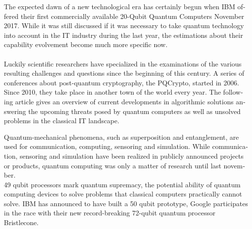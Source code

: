 \documentclass[a4paper,11pt,draft]{article}
\begin{document}
\begin{otherlanguage}{english}

\vspace{3mm}
\begin{multicols}{2}
\noindent


The expected dawn of a new technological era has certainly begun when IBM offered their first commercially available 20-Qubit Quantum Computers November 2017.
While it was still discussed if it was necessary to take quantum technology into account in the IT industry during the last year, the estimations about their capability evolvement become much more specific now.\\ \\
Luckily scientific researchers have specialized in the examinations of the various resulting challenges and questions since the beginning of this century. A series of conferences about post-quantum cryptography, the PQCrypto, started in 2006. Since 2010, they take place in another town of the world every year. The following article gives an overview of current developments in algorithmic solutions answering the upcoming threats posed by quantum computers as well as unsolved problems in the classical IT landscape. 

Quantum-mechanical phenomena, such as superposition and entanglement, are used for communication, computing, sensoring and simulation. While communication, sensoring and simulation have been realized in publicly announced projects or products, quantum computing was only a matter of research until last november. \\
49 qubit processors mark quantum supremacy, the potential ability of quantum computing devices to solve problems that classical computers practically cannot solve. IBM has announced to have built a 50 qubit prototype, Google participates in the race with their new record-breaking 72-qubit quantum processor Bristlecone.


\end{multicols}
\end{otherlanguage}
\end{document}
